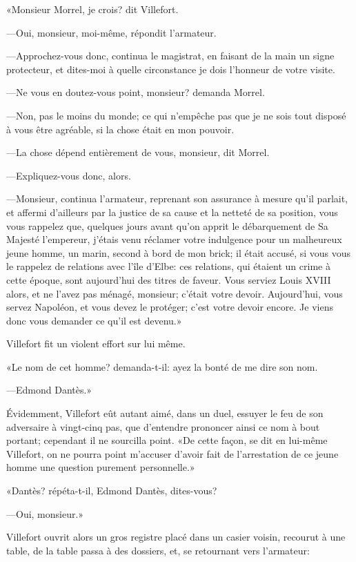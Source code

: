 «Monsieur Morrel, je crois? dit Villefort.

—Oui, monsieur, moi-même, répondit l'armateur.

—Approchez-vous donc, continua le magistrat, en faisant de la main un signe protecteur, et dites-moi à quelle circonstance je dois l'honneur de votre visite.

—Ne vous en doutez-vous point, monsieur? demanda Morrel.

—Non, pas le moins du monde; ce qui n'empêche pas que je ne sois tout disposé à vous être agréable, si la chose était en mon pouvoir.

—La chose dépend entièrement de vous, monsieur, dit Morrel.

—Expliquez-vous donc, alors.

—Monsieur, continua l'armateur, reprenant son assurance à mesure qu'il parlait, et affermi d'ailleurs par la justice de sa cause et la netteté de sa position, vous vous rappelez que, quelques jours avant qu'on apprit le débarquement de Sa Majesté l'empereur, j'étais venu réclamer votre indulgence pour un malheureux jeune homme, un marin, second à bord de mon brick; il était accusé, si vous vous le rappelez de relations avec l'île d'Elbe: ces relations, qui étaient un crime à cette époque, sont aujourd'hui des titres de faveur. Vous serviez Louis XVIII alors, et ne l'avez pas ménagé, monsieur; c'était votre devoir. Aujourd'hui, vous servez Napoléon, et vous devez le protéger; c'est votre devoir encore. Je viens donc vous demander ce qu'il est devenu.»

Villefort fit un violent effort sur lui même.

«Le nom de cet homme? demanda-t-il: ayez la bonté de me dire son nom.

—Edmond Dantès.»

Évidemment, Villefort eût autant aimé, dans un duel, essuyer le feu de son adversaire à vingt-cinq pas, que d'entendre prononcer ainsi ce nom à bout portant; cependant il ne sourcilla point. «De cette façon, se dit en lui-même Villefort, on ne pourra point m'accuser d'avoir fait de l'arrestation de ce jeune homme une question purement personnelle.»

«Dantès? répéta-t-il, Edmond Dantès, dites-vous?

—Oui, monsieur.»

Villefort ouvrit alors un gros registre placé dans un casier voisin, recourut à une table, de la table passa à des dossiers, et, se retournant vers l'armateur:

